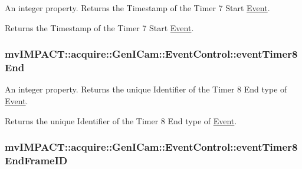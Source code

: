 An integer property. Returns the Timestamp of the Timer 7 Start \hyperlink{classmv_i_m_p_a_c_t_1_1acquire_1_1_event}{Event}. 

Returns the Timestamp of the Timer 7 Start \hyperlink{classmv_i_m_p_a_c_t_1_1acquire_1_1_event}{Event}. \hypertarget{classmv_i_m_p_a_c_t_1_1acquire_1_1_gen_i_cam_1_1_event_control_ac2ab73a7d716365793b261dbc85aa443}{
\subsubsection[{event\+Timer8\+End}]{ mv\+I\+M\+P\+A\+C\+T\+::acquire\+::\+Gen\+I\+Cam\+::\+Event\+Control\+::event\+Timer8\+End}}\label{classmv_i_m_p_a_c_t_1_1acquire_1_1_gen_i_cam_1_1_event_control_ac2ab73a7d716365793b261dbc85aa443}


An integer property. Returns the unique Identifier of the Timer 8 End type of \hyperlink{classmv_i_m_p_a_c_t_1_1acquire_1_1_event}{Event}. 

Returns the unique Identifier of the Timer 8 End type of \hyperlink{classmv_i_m_p_a_c_t_1_1acquire_1_1_event}{Event}. \hypertarget{classmv_i_m_p_a_c_t_1_1acquire_1_1_gen_i_cam_1_1_event_control_a77db5dd659be0dc0913a052b0c15dcdd}{
\subsubsection[{event\+Timer8\+End\+Frame\+I\+D}]{ mv\+I\+M\+P\+A\+C\+T\+::acquire\+::\+Gen\+I\+Cam\+::\+Event\+Control\+::event\+Timer8\+End\+Frame\+I\+D}}\label{classmv_i_m_p_a_c_t_1_1acquire_1_1_gen_i_cam_1_1_event_control_a77db5dd659be0dc0913a052b0c15dcdd}


